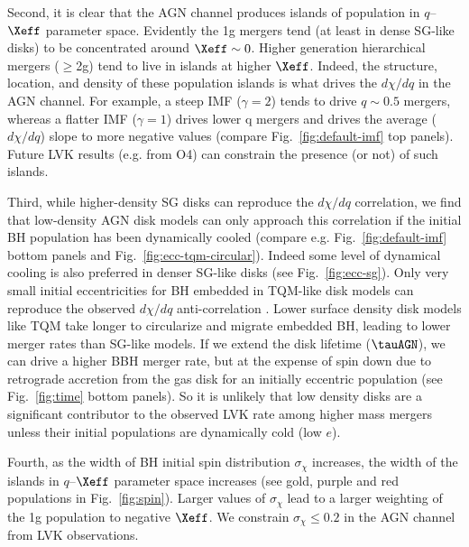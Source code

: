 Second, it is clear that the AGN channel produces islands of population in $q$--$\Xeff$ parameter space.
Evidently the 1g mergers tend (at least in dense SG-like disks) to be concentrated around $\Xeff \sim 0$.
Higher generation hierarchical mergers ($\geq$2g) tend to live in islands at higher $\Xeff$.
Indeed, the structure, location, and density of these population islands is what drives the $d\chi/dq$ in the AGN channel.
For example, a steep IMF ($\gamma=2$) tends to drive $q \sim 0.5$ mergers, whereas a flatter IMF ($\gamma=1$) drives lower q mergers and drives the average ($d\chi/dq$) slope to more negative values (compare Fig.~\ref{fig:default-imf} top panels).
Future LVK results (e.g.
from O4) can constrain the presence (or not) of such islands.

Third, while higher-density SG disks can reproduce the $d\chi/dq$ correlation, we find that low-density AGN disk models can only approach this correlation if the initial BH population has been dynamically cooled (compare e.g.
Fig.~\ref{fig:default-imf} bottom panels and Fig.~\ref{fig:ecc-tqm-circular}).
Indeed some level of dynamical cooling is also preferred in denser SG-like disks (see Fig.~\ref{fig:ecc-sg}).
Only very small initial eccentricities for BH embedded in TQM-like disk models can reproduce the observed $d\chi/dq$ anti-correlation  \citep{Callister+21}.
Lower surface density disk models like TQM take longer to circularize and migrate embedded BH, leading to lower merger rates than SG-like models.
If we extend the disk lifetime ($\tauAGN$), we can drive a higher BBH merger rate, but at the expense of spin down due to retrograde accretion from the gas disk for an initially eccentric population (see Fig.~\ref{fig:time} bottom panels).
So it is unlikely that low density disks are a significant contributor to the observed LVK rate among higher mass mergers unless their initial populations are dynamically cold (low $e$).

Fourth, as the width of BH initial spin distribution $\sigma_\chi$ increases, the width of the islands in $q$--$\Xeff$ parameter space increases (see gold, purple and red populations in  Fig.~\ref{fig:spin}).
Larger values of $\sigma_\chi$ lead to a larger weighting of the 1g population to negative $\Xeff$.
We constrain $\sigma_\chi \leq 0.2$ in the AGN channel from LVK observations.

